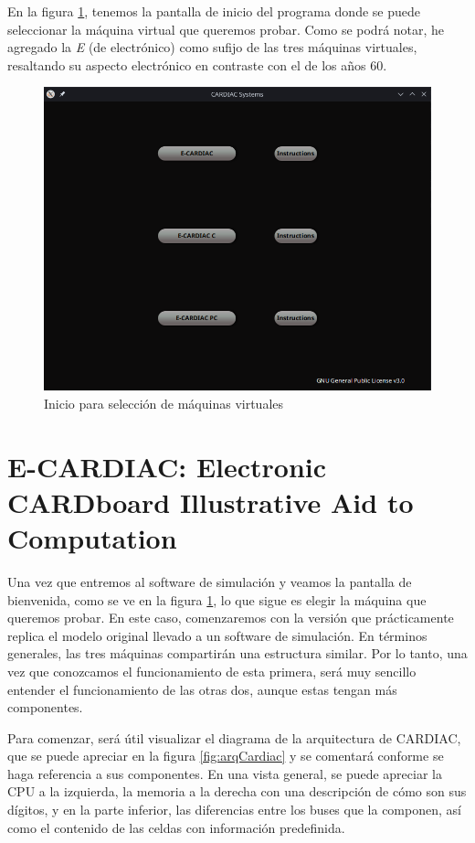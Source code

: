 \documentclass[letterpaper,12pt,oneside]{book}
\begin{document}
    En la figura \ref{fig:welcomeec}, tenemos la pantalla de inicio del programa
	donde se puede seleccionar la máquina virtual que queremos probar. Como se podrá notar, he agregado la \textit{E} (de electrónico) como sufijo de 		
	las tres máquinas virtuales, resaltando su aspecto electrónico en contraste con el de los años 60.


	
	\begin{figure}[h]
 			\centering
			\includegraphics[scale=0.8]{media/CARDIACC/WelcomeEC.png}
			\caption{Inicio para selección de máquinas virtuales}
			\label{fig:welcomeec}
	\end{figure}

	\clearpage
	\section{E-CARDIAC: Electronic CARDboard Illustrative Aid to Computation}
	
	Una vez que entremos al software de simulación y veamos la pantalla de bienvenida, como se ve en la figura \ref{fig:welcomeec}, lo que sigue es elegir la máquina
	que queremos probar. En este caso, comenzaremos con la versión que prácticamente replica el modelo original
	llevado a un software de simulación. En términos
	generales, las tres máquinas compartirán una estructura similar. Por lo tanto, una vez que conozcamos el funcionamiento de esta primera, será muy sencillo
	entender el funcionamiento de las otras dos, aunque estas tengan más componentes.
 
    Para comenzar, será útil visualizar el diagrama de la arquitectura de CARDIAC,
	que se puede apreciar en la figura \ref{fig:arqCardiac} y se comentará conforme se haga referencia a sus componentes. En
	una vista general, se puede apreciar la CPU a la izquierda, la memoria a la derecha con una descripción de cómo son sus dígitos, y en la 
	parte inferior, las diferencias entre los buses que la componen, así como el contenido de las celdas con información predefinida.
\end{document}
